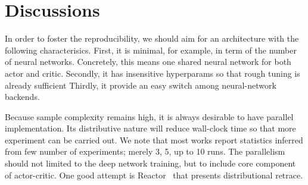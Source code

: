 \section{Discussions}
In order to foster the reproducibility, we should aim for an architecture with the following characterisics.
First, it is minimal, for example, in term of the number of neural networks.
Concretely, this means one shared neural network for both actor and critic.
Secondly, it has insensitive hyperparams so that rough tuning is already sufficient
Thirdly, it provide an easy switch among neural-network backends.

Because sample complexity remains high, it is always desirable to have parallel implementation.
Its distributive nature will reduce wall-clock time so that more experiment can be carried out.
We note that most works report statistics inferred from few number of experiments; merely 3, 5, up to 10 runs.
The parallelism should not limited to the deep network training, but to include core component of actor-critic.
One good attempt is Reactor~\cite{} that presents distributional retrace.
